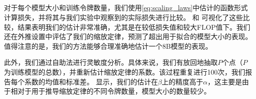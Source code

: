 \begin{figure*}[h!]
\begin{minipage}[t]{0.4\linewidth}
        \begin{minipage}[t]{\linewidth}
            \centering
            \vspace{-2.8cm}
            \setlength{\tabcolsep}{12pt}
            \renewcommand{\arraystretch}{1}
            \label{tab:scaling_laws_sensitivity_main}
        \end{minipage}
    \end{minipage}
\end{figure*}
\subsection{}
\label{sec:scaling_laws_evaluation}
对于每个模型大小和训练令牌数量，我们使用\cref{eq:scaling_laws}中估计的函数形式计算损失，并将其与我们实验中观察到的实际损失进行比较。 和  可视化了这些比较，结果表明我们的估计非常准确，尤其是在较低损失值和较大FLOP值下。我们还在外推设置中评估了我们的缩放定律，预测了超出用于拟合的模型大小的表现。值得注意的是，我们的方法能够合理准确地估计一个8B模型的表现。

此外，我们通过自助法进行灵敏度分析。具体来说，我们有放回地抽取\( P \)个点（\( P \)为训练模型的总数），并重新估计缩放定律的系数。该过程重复进行100次，我们报告每个系数的均值和标准差。 显示，我们的估计在\(\beta\)上的精度高于\(\alpha\)，这主要是由于相对于用于推导缩放定律的不同令牌数量，模型大小的数量较少。

